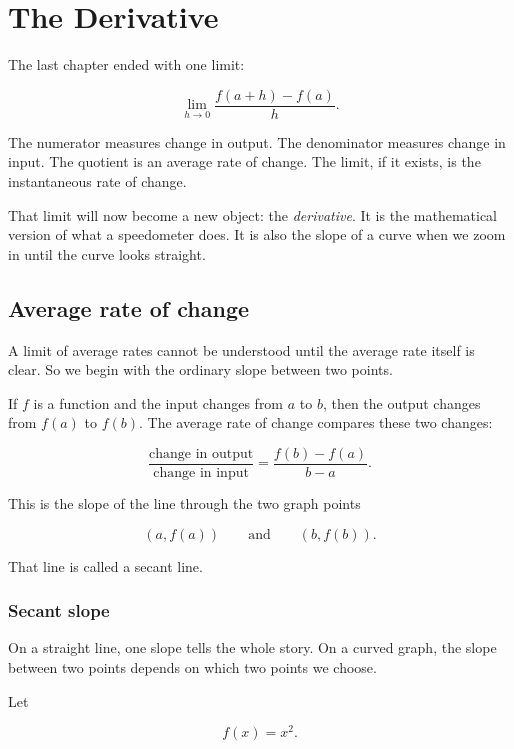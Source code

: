 
\chapter{The Derivative}
\label{chap:derivative}

The last chapter ended with one limit:

\[
\lim_{h\to0}\frac{f(a+h)-f(a)}{h}.
\]

The numerator measures change in output.  The denominator measures change in input.  The quotient is an average rate of change.  The limit, if it exists, is the instantaneous rate of change.

That limit will now become a new object: the \emph{derivative}.  It is the mathematical version of what a speedometer does.  It is also the slope of a curve when we zoom in until the curve looks straight.

\section{Average rate of change}
\label{sec:average-rate-of-change}

A limit of average rates cannot be understood until the average rate itself is clear.  So we begin with the ordinary slope between two points.

If \(f\) is a function and the input changes from \(a\) to \(b\), then the output changes from \(f(a)\) to \(f(b)\).  The average rate of change compares these two changes:

\[
\frac{\text{change in output}}{\text{change in input}}
=
\frac{f(b)-f(a)}{b-a}.
\]

This is the slope of the line through the two graph points

\[
(a,f(a))
\qquad\text{and}\qquad
(b,f(b)).
\]

That line is called a secant line.

\subsection{Secant slope}
\label{subsec:secant-slope}

On a straight line, one slope tells the whole story.  On a curved graph, the slope between two points depends on which two points we choose.

Let

\[
f(x)=x^2.
\]

